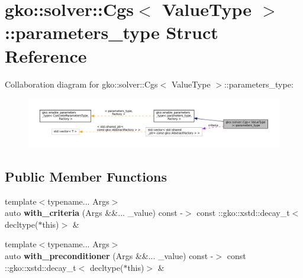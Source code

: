 \hypertarget{structgko_1_1solver_1_1Cgs_1_1parameters__type}{}\section{gko\+:\+:solver\+:\+:Cgs$<$ Value\+Type $>$\+:\+:parameters\+\_\+type Struct Reference}
\label{structgko_1_1solver_1_1Cgs_1_1parameters__type}


Collaboration diagram for gko\+:\+:solver\+:\+:Cgs$<$ Value\+Type $>$\+:\+:parameters\+\_\+type\+:
\nopagebreak
\begin{figure}[H]
\begin{center}
\leavevmode
\includegraphics[width=350pt]{structgko_1_1solver_1_1Cgs_1_1parameters__type__coll__graph}
\end{center}
\end{figure}
\subsection*{Public Member Functions}
\begin{DoxyCompactItemize}
\item 
\mbox{\label{structgko_1_1solver_1_1Cgs_1_1parameters__type_a3709a0a762f19d503921f4f02d9b24c0}} 
{\footnotesize template$<$typename... Args$>$ }\\auto {\bfseries with\+\_\+criteria} (Args \&\&... \+\_\+value) const -\/$>$ const \+::gko\+::xstd\+::decay\+\_\+t$<$ decltype($\ast$this)$>$ \&
\item 
\mbox{\label{structgko_1_1solver_1_1Cgs_1_1parameters__type_abeaf24c49b94e371901fd83f084dfd8a}} 
{\footnotesize template$<$typename... Args$>$ }\\auto {\bfseries with\+\_\+preconditioner} (Args \&\&... \+\_\+value) const -\/$>$ const \+::gko\+::xstd\+::decay\+\_\+t$<$ decltype($\ast$this)$>$ \&
\end{DoxyCompactItemize}
